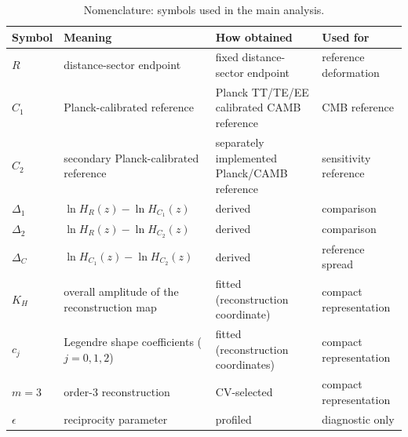 \begin{table}[!htbp]
  \centering
  \caption{Nomenclature: symbols used in the main analysis.}
  \label{tab:nomenclature}
  \begin{tabularx}{\linewidth}{lXXX}
    \toprule
    Symbol & Meaning & How obtained & Used for \\
    \midrule
    $R$ & distance-sector endpoint &
      fixed distance-sector endpoint & reference deformation \\
    $C_{1}$ & Planck-calibrated reference &
      Planck TT/TE/EE calibrated CAMB reference & CMB reference \\
    $C_{2}$ & secondary Planck-calibrated reference &
      separately implemented Planck/CAMB reference & sensitivity reference \\
    $\Delta_{1}$ & $\ln H_{R}(z)-\ln H_{C_{1}}(z)$ &
      derived & comparison \\
    $\Delta_{2}$ & $\ln H_{R}(z)-\ln H_{C_{2}}(z)$ &
      derived & comparison \\
    $\Delta_{C}$ & $\ln H_{C_{1}}(z)-\ln H_{C_{2}}(z)$ &
      derived & reference spread \\
    $K_{H}$ & overall amplitude of the reconstruction map &
      fitted (reconstruction coordinate) & compact representation \\
    $c_{j}$ & Legendre shape coefficients ($j=0,1,2$) &
      fitted (reconstruction coordinates) & compact representation \\
    $m=3$ & order-3 reconstruction &
      CV-selected & compact representation \\
    $\epsilon$ & reciprocity parameter &
      profiled & diagnostic only \\
    \bottomrule
  \end{tabularx}
\end{table}
